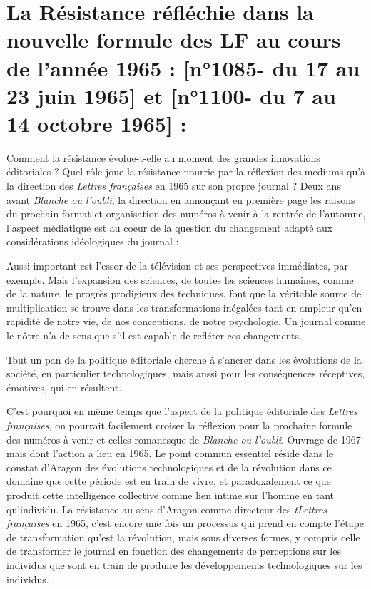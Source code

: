 \section{La Résistance réfléchie dans la nouvelle formule des LF au cours de l’année 1965 : [n°1085- du 17 au 23 juin 1965] et  [n°1100- du 7 au 14 octobre 1965] :}


Comment la résistance évolue-t-elle au moment des grandes innovations éditoriales ? Quel rôle joue la résistance nourrie par la réflexion des mediums qu’à la direction des \emph{Lettres françaises} en 1965 sur son propre journal ? Deux ans avant \emph{Blanche ou l’oubli}, la direction en annonçant en première page les raisons du prochain format et organisation des numéros à venir à la rentrée de l’automne, l’aspect médiatique est au coeur de la question du changement adapté aux considérations idéologiques du journal :

Aussi important est l’essor de la télévision et ses perspectives immédiates, par exemple. Mais l’expansion des sciences, de toutes les sciences humaines, comme de la nature, le progrès prodigieux des techniques, font que la véritable source de multiplication se trouve dans les transformations inégalées tant en ampleur qu’en rapidité de notre vie, de nos conceptions, de notre psychologie. Un journal comme le nôtre n’a de sens que s’il est capable de refléter ces changements. 



	Tout un pan de la politique éditoriale cherche à s’ancrer dans les évolutions de la société, en particulier technologiques, mais aussi pour les conséquences réceptives, émotives, qui en résultent.

	C’est pourquoi en même temps que l’aspect de la politique éditoriale des \emph{Lettres françaises}, on pourrait facilement croiser la réflexion pour la prochaine formule des numéros à venir et celles romanesque de \emph{Blanche ou l’oubli}. Ouvrage de 1967 mais dont l’action a lieu en 1965. Le point commun essentiel réside dans le constat d’Aragon des évolutions technologiques et de la révolution dans ce domaine que cette période est en train de vivre, et paradoxalement ce que produit cette intelligence collective comme lien intime sur l’homme en tant qu’individu. La résistance au sens d’Aragon comme directeur des \emph{tLettres françaises} en 1965, c’est encore une fois un processus qui prend en compte l’étape de transformation qu’est la révolution, mais sous diverses formes, y compris celle de transformer le journal en fonction des changements de perceptions sur les individus que sont en train de produire les développements technologiques sur les individus.

